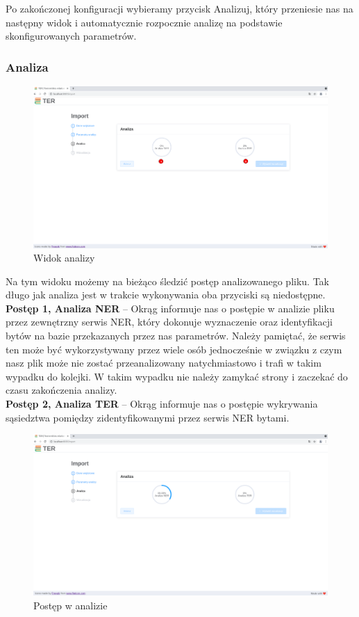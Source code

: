 \documentclass[12pt, a4paper]{article}
\begin{document}
Po zakończonej konfiguracji wybieramy przycisk Analizuj, który przeniesie nas na następny widok i automatycznie rozpocznie analizę na podstawie skonfigurowanych parametrów.


\subsubsection{Analiza}

\begin{figure}[H]
    \centering
    \includegraphics[width=\linewidth]{images/analiza.png}
    \caption{Widok analizy}
\end{figure}

Na tym widoku możemy na bieżąco śledzić postęp analizowanego pliku. Tak długo jak analiza jest w trakcie wykonywania oba przyciski są niedostępne.\\

\noindent\textbf{Postęp 1, Analiza NER} -- Okrąg informuje nas o postępie w analizie pliku przez zewnętrzny serwis NER, który dokonuje wyznaczenie oraz identyfikacji bytów na bazie przekazanych przez nas parametrów. Należy pamiętać, że serwis ten może być wykorzystywany przez wiele osób jednocześnie w związku z czym nasz plik może nie zostać przeanalizowany natychmiastowo i trafi w takim wypadku do kolejki. W takim wypadku nie należy zamykać strony i zaczekać do czasu zakończenia analizy.\\

\noindent\textbf{Postęp 2, Analiza TER} -- Okrąg informuje nas o postępie wykrywania sąsiedztwa pomiędzy zidentyfikowanymi przez serwis NER bytami.

\begin{figure}[H]
    \centering
    \includegraphics[width=\linewidth]{images/analiza-w-trakcie.png}
    \caption{Postęp w analizie}
\end{figure}
\end{document}
